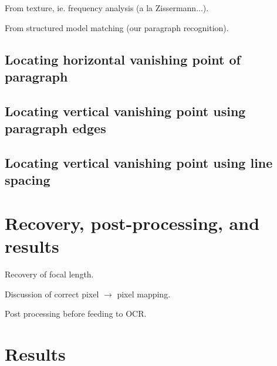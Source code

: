 


From texture, ie. frequency analysis (a la Zissermann...).

From structured model matching (our paragraph recognition).



\section{Locating horizontal vanishing point of paragraph} %

\section{Locating vertical vanishing point using paragraph edges} %

\section{Locating vertical vanishing point using line spacing} %





\chapter{Recovery, post-processing, and results}


Recovery of focal length.

Discussion of correct pixel $\rightarrow$  pixel mapping.

Post processing before feeding to OCR.





\chapter{Results}


